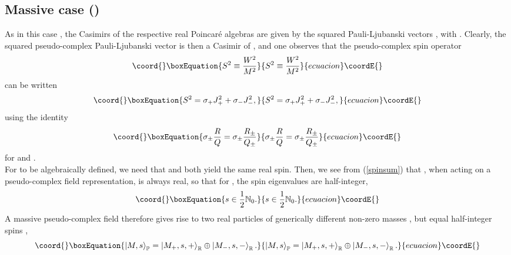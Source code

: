 \documentclass[a4paper,aps,prd,showkeys,showpacs,superscriptaddress,preprint]{revtex4}
\providecommand{\pc}{\mathbb{P}}
\providecommand{\reals}{\mathbb{R}}
\begin{document}
\subsection{Massive case (\myHighlight{$M^2 \not\in\pc^0$}\coordHE{})}
As in this case \coordHE{}, the Casimirs of the respective real Poincar\'e algebras
are given by the squared Pauli-Ljubanski vectors \coordHE{}, with \coordHE{}. Clearly,
the squared pseudo-complex Pauli-Ljubanski vector \coordHE{} is then a
Casimir of \myHighlight{$\mathcal{P}_\pc$}\coordHE{}, and one observes that the pseudo-complex
spin operator
\begin{equation}\coord{}\boxEquation{
  S^2 \equiv \frac{W^2}{M^2}
}{
  S^2 \equiv \frac{W^2}{M^2}
}{ecuacion}\coordE{}\end{equation}
can be written
\begin{equation}\coord{}\boxEquation{\label{spinsum}
  S^2 = \sigma_+ J_+^2 + \sigma_- J_-^2,
}{S^2 = \sigma_+ J_+^2 + \sigma_- J_-^2,
}{ecuacion}\coordE{}\end{equation}
using the identity
\begin{equation}\coord{}\boxEquation{\label{sigmaquotient}
\sigma_\pm \frac{R}{Q} = \sigma_\pm \frac{R_\pm}{Q_\pm}
}{\sigma_\pm \frac{R}{Q} = \sigma_\pm \frac{R_\pm}{Q_\pm}
}{ecuacion}\coordE{}\end{equation}
for \myHighlight{$R,Q \in\pc$}\coordHE{} and \myHighlight{$Q\not\in\pc^0$}\coordHE{}.\\
For \myHighlight{$\phi = \sigma_+ \phi_+ + \sigma_- \phi_-$}\coordHE{} to be algebraically
defined, we need that \coordHE{} and \coordHE{} both yield the same real
spin. Then, we see from (\ref{spinsum}) that \coordHE{}, when acting on a pseudo-complex field
representation, is always real, so that for \coordHE{}, the spin
eigenvalues are half-integer,
\begin{equation}\coord{}\boxEquation{
  s \in \frac{1}{2}\mathbb{N}_0.
}{
  s \in \frac{1}{2}\mathbb{N}_0.
}{ecuacion}\coordE{}\end{equation}
A massive pseudo-complex field therefore gives rise to two real
particles of generically different non-zero masses \coordHE{}, but equal
half-integer spins \coordHE{},
\begin{equation}\coord{}\boxEquation{
  \left|M, s\right>_\pc = \left|M_+, s, +\right>_\reals \oplus \left|M_-, s, -\right>_\reals.
}{
  \left|M, s\right>_\pc = \left|M_+, s, +\right>_\reals \oplus \left|M_-, s, -\right>_\reals.
}{ecuacion}\coordE{}\end{equation}
\end{document}

